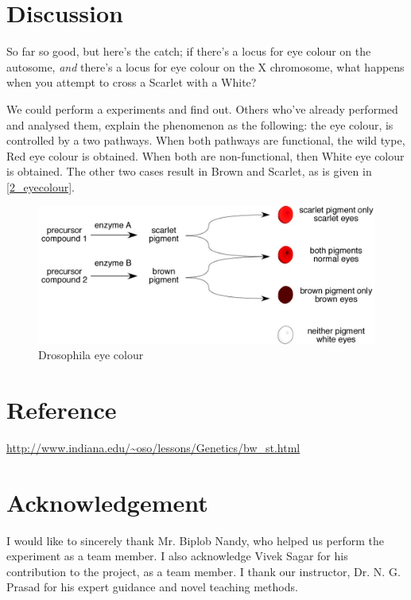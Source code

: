 \section{Discussion}
	So far so good, but here's the catch; if there's a locus for eye colour on the autosome, \emph{and} there's a locus for eye colour on the X chromosome, what happens when you attempt to cross a Scarlet with a White?
	\par
	We could perform a experiments and find out. Others who've already performed and analysed them, explain the phenomenon as the following: the eye colour, is controlled by a two pathways. When both pathways are functional, the wild type, Red eye colour is obtained. When both are non-functional, then White eye colour is obtained. The other two cases result in Brown and Scarlet, as is given in \autoref{2_eyecolour}.

	\begin{figure}[bth]
		\begin{center}
			\includegraphics[width=1.0\linewidth]{gfx/eyecolor}
		\end{center}
	\caption[Drosophila eye colour]{Drosophila eye colour}
	\label{2_eyecolour}
	\end{figure}

\section{Reference}
	\url{http://www.indiana.edu/~oso/lessons/Genetics/bw_st.html}

\section{Acknowledgement}
	I would like to sincerely thank Mr. Biplob Nandy, who helped us perform the experiment as a team member. I also acknowledge Vivek Sagar for his contribution to the project, as a team member. I thank our instructor, Dr. N. G. Prasad for his expert guidance and novel teaching methods.